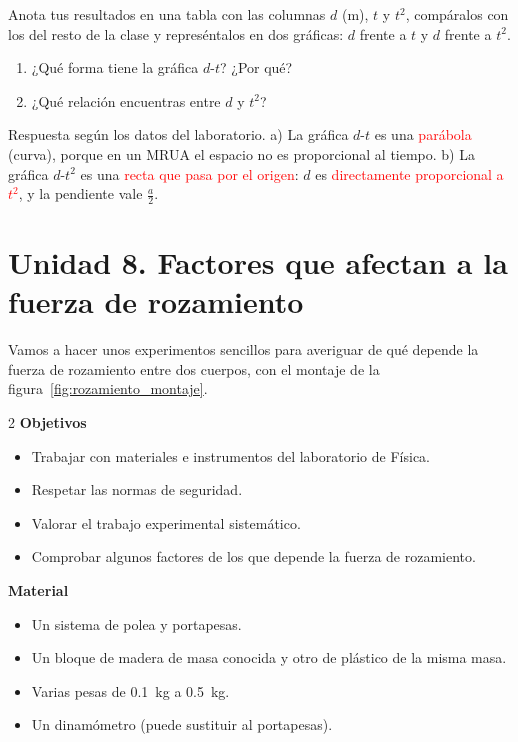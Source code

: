 \begin{exercise}
    Anota tus resultados en una tabla con las columnas \(d\) (m), \(t\) y \(t^2\), compáralos con los del resto de la clase y represéntalos en dos gráficas: \(d\) frente a \(t\) y \(d\) frente a \(t^2\).
    \begin{enumerate}[label=\alph*)]
        \item ¿Qué forma tiene la gráfica \(d\)-\(t\)? ¿Por qué?
        \item ¿Qué relación encuentras entre \(d\) y \(t^2\)?
    \end{enumerate}
    \begin{solu}
        Respuesta según los datos del laboratorio. a) La gráfica \(d\)-\(t\) es una \textcolor{red}{parábola} (curva), porque en un MRUA el espacio no es proporcional al tiempo. b) La gráfica \(d\)-\(t^2\) es una \textcolor{red}{recta que pasa por el origen}: \(d\) es \textcolor{red}{directamente proporcional a \(t^2\)}, y la pendiente vale \(\frac{a}{2}\).
    \end{solu}
\end{exercise}

\section{Unidad 8. Factores que afectan a la fuerza de rozamiento}

Vamos a hacer unos experimentos sencillos para averiguar de qué depende la fuerza de rozamiento entre dos cuerpos, con el montaje de la figura~\ref{fig:rozamiento_montaje}.

\begin{multicols}{2}
    \textbf{Objetivos}
    \begin{itemize}
        \item Trabajar con materiales e instrumentos del laboratorio de Física.
        \item Respetar las normas de seguridad.
        \item Valorar el trabajo experimental sistemático.
        \item Comprobar algunos factores de los que depende la fuerza de rozamiento.
    \end{itemize}
    \columnbreak
    \textbf{Material}
    \begin{itemize}
        \item Un sistema de polea y portapesas.
        \item Un bloque de madera de masa conocida y otro de plástico de la misma masa.
        \item Varias pesas de \qty{0.1}{\kg} a \qty{0.5}{\kg}.
        \item Un dinamómetro (puede sustituir al portapesas).
    \end{itemize}
\end{multicols}

